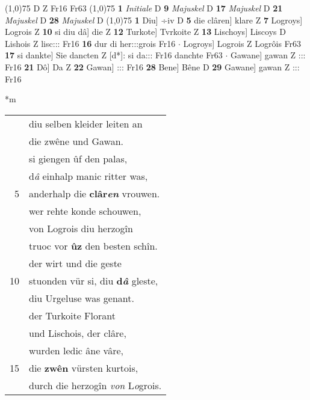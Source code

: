 \documentclass[8pt,a4paper,notitlepage]{article}
\begin{document}
\begin{table}[ht]
\begin{minipage}[t]{0.5\linewidth}
\begin{tabular}{rl}
\end{tabular}
\scriptsize
\line(1,0){75} \newline
D Z Fr16 Fr63 \newline
\line(1,0){75} \newline
\textbf{1} \textit{Initiale} D  \textbf{9} \textit{Majuskel} D  \textbf{17} \textit{Majuskel} D  \textbf{21} \textit{Majuskel} D  \textbf{28} \textit{Majuskel} D  \newline
\line(1,0){75} \newline
\textbf{1} Diu] ÷iv D \textbf{5} die clâren] klare Z \textbf{7} Logroys] Logrois Z \textbf{10} si diu dâ] die Z \textbf{12} Turkote] Tvrkoite Z \textbf{13} Lischoys] Liscoys D Lishois Z lisc::: Fr16 \textbf{16} dur di her:::grois Fr16  $\cdot$ Logroys] Logrois Z Logrôis Fr63 \textbf{17} si dankte] Sie dancten Z [d*]: si da::: Fr16 danchte Fr63  $\cdot$ Gawane] gawan Z ::: Fr16 \textbf{21} Dô] Da Z \textbf{22} Gawan] ::: Fr16 \textbf{28} Bene] Bêne D \textbf{29} Gawane] gawan Z ::: Fr16 \newline
\end{minipage}
\hspace{0.5cm}
\begin{minipage}[t]{0.5\linewidth}
\small
\begin{center}*m
\end{center}
\begin{tabular}{rl}
 & diu selben kleider leiten an\\ 
 & die zwêne und Gawan.\\ 
 & si giengen ûf den palas,\\ 
 & d\textit{â} einhalp manic ritter was,\\ 
5 & anderhalp die \textbf{clâr\textit{en}} vrouwen.\\ 
 & wer rehte konde schouwen,\\ 
 & von Logrois diu herzogîn\\ 
 & truoc vor \textbf{ûz} den besten schîn.\\ 
 & der wirt und die geste\\ 
10 & stuonden vür si, diu \textbf{d\textit{â}} gleste,\\ 
 & diu Urgeluse was genant.\\ 
 & der Turkoite Florant\\ 
 & und Lischois, der clâre,\\ 
 & wurden ledic âne vâre,\\ 
15 & die \textbf{zwên} vürsten kurtois,\\ 
 & durch die herzogîn \textit{von} L\textit{o}grois.\\ 

\end{tabular}
\end{minipage}
\end{table}
\end{document}
